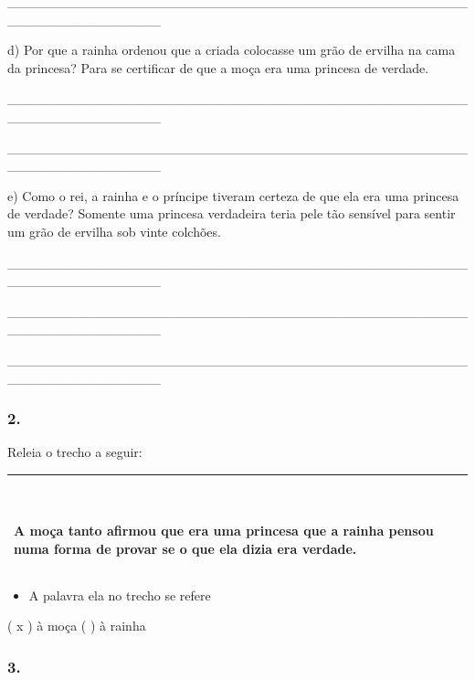 \_\_\_\_\_\_\_\_\_\_\_\_\_\_\_\_\_\_\_\_\_\_\_\_\_\_\_\_\_\_\_\_\_\_\_\_\_\_\_\_\_\_\_\_\_\_\_\_\_\_\_\_\_\_\_\_\_\_\_\_\_\_\_\_

d) Por que a rainha ordenou que a criada colocasse um grão de ervilha na
cama da princesa? Para se certificar de que a moça era uma princesa de
verdade.

\_\_\_\_\_\_\_\_\_\_\_\_\_\_\_\_\_\_\_\_\_\_\_\_\_\_\_\_\_\_\_\_\_\_\_\_\_\_\_\_\_\_\_\_\_\_\_\_\_\_\_\_\_\_\_\_\_\_\_\_\_\_\_\_

\_\_\_\_\_\_\_\_\_\_\_\_\_\_\_\_\_\_\_\_\_\_\_\_\_\_\_\_\_\_\_\_\_\_\_\_\_\_\_\_\_\_\_\_\_\_\_\_\_\_\_\_\_\_\_\_\_\_\_\_\_\_\_\_

e) Como o rei, a rainha e o príncipe tiveram certeza de que ela era uma
princesa de verdade? Somente uma princesa verdadeira teria pele tão
sensível para sentir um grão de ervilha sob vinte colchões.

\_\_\_\_\_\_\_\_\_\_\_\_\_\_\_\_\_\_\_\_\_\_\_\_\_\_\_\_\_\_\_\_\_\_\_\_\_\_\_\_\_\_\_\_\_\_\_\_\_\_\_\_\_\_\_\_\_\_\_\_\_\_\_\_

\_\_\_\_\_\_\_\_\_\_\_\_\_\_\_\_\_\_\_\_\_\_\_\_\_\_\_\_\_\_\_\_\_\_\_\_\_\_\_\_\_\_\_\_\_\_\_\_\_\_\_\_\_\_\_\_\_\_\_\_\_\_\_\_

\_\_\_\_\_\_\_\_\_\_\_\_\_\_\_\_\_\_\_\_\_\_\_\_\_\_\_\_\_\_\_\_\_\_\_\_\_\_\_\_\_\_\_\_\_\_\_\_\_\_\_\_\_\_\_\_\_\_\_\_\_\_\_\_

\subsubsection{2. }\label{section-72}

Releia o trecho a seguir:

\begin{longtable}[]{@{}l@{}}
\toprule
\begin{minipage}[t]{0.97\columnwidth}\raggedright\strut
~ ~

A moça tanto afirmou que era uma princesa que a rainha pensou numa forma
de provar se o que ela dizia era verdade.\strut
\end{minipage}\tabularnewline
\bottomrule
\end{longtable}

\begin{itemize}
\item
  A palavra ela no trecho se refere
\end{itemize}

( x ) à moça ( ) à rainha

\subsubsection{3. }\label{section-73}

